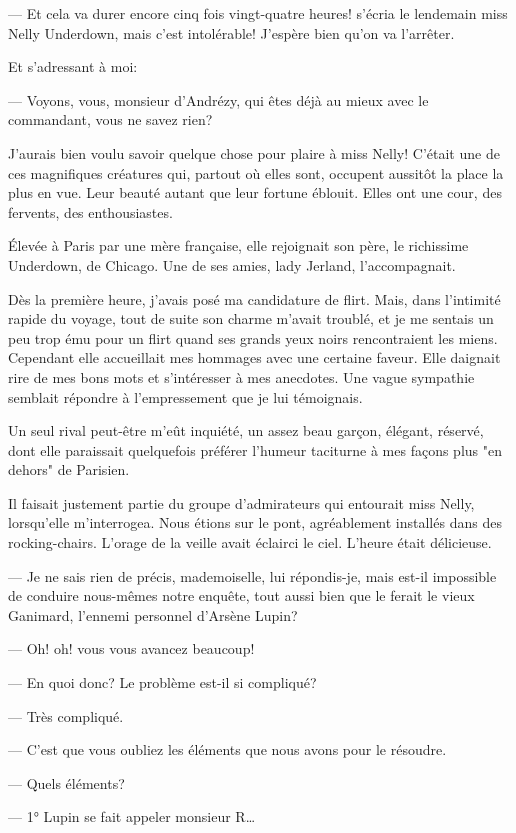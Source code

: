 \documentclass[12pt,a4paper]{article}
\begin{document}
— Et cela va durer encore cinq fois vingt-quatre heures! s’écria le lendemain miss Nelly Underdown, mais c’est intolérable! J’espère bien qu’on va l’arrêter. 

Et s’adressant à moi:

— Voyons, vous, monsieur d’Andrézy, qui êtes déjà au mieux avec le commandant, vous ne savez rien?

J’aurais bien voulu savoir quelque chose pour plaire à miss Nelly! C’était une de ces magnifiques créatures qui, partout où elles sont, occupent aussitôt la place la plus en vue. Leur beauté autant que leur fortune éblouit. Elles ont une cour, des fervents, des enthousiastes.

Élevée à Paris par une mère française, elle rejoignait son père, le richissime Underdown, de Chicago. Une de ses amies, lady Jerland, l’accompagnait.

Dès la première heure, j’avais posé ma candidature de flirt. Mais, dans l’intimité rapide du voyage, tout de suite son charme m’avait troublé, et je me sentais un peu trop ému pour un flirt quand ses grands yeux noirs rencontraient les miens. Cependant elle accueillait mes hommages avec une certaine faveur. Elle daignait rire de mes bons mots et s’intéresser à mes anecdotes. Une vague sympathie semblait répondre à l’empressement que je lui témoignais.

Un seul rival peut-être m’eût inquiété, un assez beau garçon, élégant, réservé, dont elle paraissait quelquefois préférer l’humeur taciturne à mes façons plus "en dehors" de Parisien.

Il faisait justement partie du groupe d’admirateurs qui entourait miss Nelly, lorsqu’elle m’interrogea. Nous étions sur le pont, agréablement installés dans des rocking-chairs. L’orage de la veille avait éclairci le ciel. L’heure était délicieuse.

— Je ne sais rien de précis, mademoiselle, lui répondis-je, mais est-il impossible de conduire nous-mêmes notre enquête, tout aussi bien que le ferait le vieux Ganimard, l’ennemi personnel d’Arsène Lupin?

— Oh! oh! vous vous avancez beaucoup!

— En quoi donc? Le problème est-il si compliqué?

— Très compliqué.

— C’est que vous oubliez les éléments que nous avons pour le résoudre.

— Quels éléments?

— 1° Lupin se fait appeler monsieur R…
\end{document}
